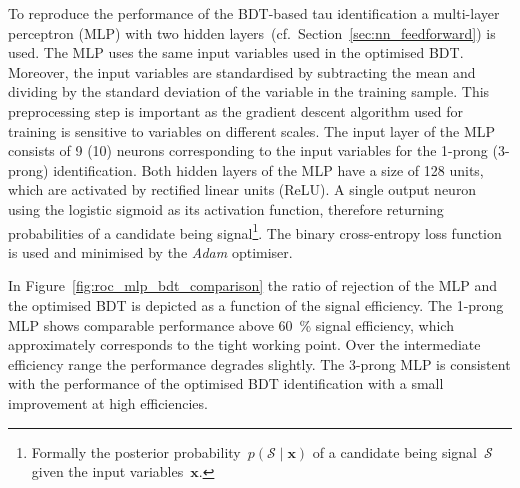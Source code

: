 To reproduce the performance of the BDT-based tau identification a multi-layer
perceptron (MLP) with two hidden layers~(cf.\ Section~\ref{sec:nn_feedforward})
is used. The MLP uses the same input variables used in the optimised BDT.
Moreover, the input variables are standardised by subtracting the mean and
dividing by the standard deviation of the variable in the training sample. This
preprocessing step is important as the gradient descent algorithm used for
training is sensitive to variables on different scales. The input layer of the
MLP consists of 9 (10) neurons corresponding to the input variables for the
1-prong (3-prong) identification. Both hidden layers of the MLP have a size of
128 units, which are activated by rectified linear units (ReLU). A single output
neuron using the logistic sigmoid as its activation function, therefore
returning probabilities of a \tauhadvis candidate being signal\footnote{Formally
  the posterior probability~$p(\mathcal{S} \mid \mathbf{x})$ of a candidate
  being signal~$\mathcal{S}$ given the input variables~$\mathbf{x}$.}. The
binary cross-entropy loss function is used and minimised by the \emph{Adam}
optimiser.

In Figure~\ref{fig:roc_mlp_bdt_comparison} the ratio of rejection of the MLP and
the optimised BDT is depicted as a function of the signal efficiency. The
1-prong MLP shows comparable performance above \SI{60}{\percent} signal
efficiency, which approximately corresponds to the tight working point. Over the
intermediate efficiency range the performance degrades slightly. The 3-prong MLP
is consistent with the performance of the optimised BDT identification with a
small improvement at high efficiencies.

